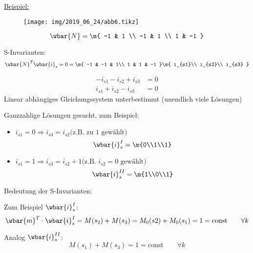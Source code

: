 \underline{Beispiel:}

\begin{figure}[H]
	\centering
	\texttt{[image: img/2019\_06\_24/abb6.tikz]}
\end{figure}

\begin{equation}
	\wbar{N} = 
	\m{
	-1 & 1 \\
	-1 & 1 \\
	1 & -1 	
	}
\end{equation}

S-Invarianten:
\begin{equation}
	\wbar{N}^T \wbar{i}_s = 0 =
	\m{
	-1 & -1 & 1\\
	1  &  1 & -1	
	}
	\m{
	i_{s1}\\
	i_{s2}\\
	i_{s3}	
	}
\end{equation}

\begin{align}
	-i_{s1} - i_{s2} + i_{s3} &= 0\\
	i_{s1} + i_{s2} - i_{s3}  &= 0
\end{align}
Linear abhängiges Gleichungssystem unterbestimmt (unendlich viele Lösungen)

Ganzzahlige Lösungen gesucht, zum Beispiel:
\begin{itemize}
	\item $i_{s1}=0 \Rightarrow i_{s3}=i_{s2} \text{(z.B. zu 1 gewählt)}$
	\begin{equation}
		\wbar{i}_s^I = \m{0\\1\\1}
	\end{equation}
	\item $i_{s1}=1 \Rightarrow i_{s3}=i_{s2}+1 \text{(z.B. $i_{s2}=0$ gewählt)}$
	\begin{equation}
	\wbar{i}_s^{II} = \m{1\\0\\1}
	\end{equation}
\end{itemize}

Bedeutung der S-Invarianten:

Zum Beispiel $\wbar{i}_{s}^I$:
\begin{equation}
	\wbar{m}^T \cdot \wbar{i}_s^I = M(s_2) + M(s_3) = M_0(s2) + M_0(s_1) = 1 =\text{const} \qquad \forall k
\end{equation}

Analog $\wbar{i}_{s}^{II}$:
\begin{equation}
	M(s_1) + M(s_3) = 1 = \text{const} \qquad \forall k
\end{equation}


